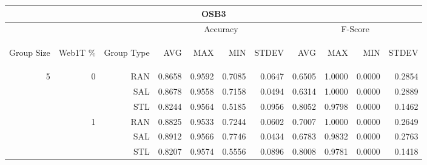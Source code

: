 \begin{center}
\begin{table}[htbp] 
 \begin{center}
\begin{tabular}{ | r | r | r | r | r | r | r | r | r | r | r |}
\hline
\multicolumn{11}{|c|}{OSB3}\\
\hline
 & & & \multicolumn{4}{|c|}{Accuracy} & \multicolumn{4}{|c|}{F-Score}\\ \cline{4-11}
\begin{sideways}Group Size\end{sideways} & \begin{sideways}Web1T \%\end{sideways} & \begin{sideways}Group Type\end{sideways} & \begin{sideways}AVG\end{sideways} & \begin{sideways}MAX\end{sideways} & \begin{sideways}MIN\end{sideways} & \begin{sideways}STDEV\end{sideways} & \begin{sideways}AVG\end{sideways} & \begin{sideways}MAX\end{sideways} & \begin{sideways}MIN\end{sideways} & \begin{sideways}STDEV\end{sideways}\\
\hline
\multirow{18}{*}{5}
 & \multirow{3}{*}{0} & RAN & 0.8658 & 0.9592 & 0.7085 & 0.0647 & 0.6505 & 1.0000 & 0.0000 & 0.2854\\ \cline{3-11}
 &   & SAL & 0.8678 & 0.9558 & 0.7158 & 0.0494 & 0.6314 & 1.0000 & 0.0000 & 0.2889\\ \cline{3-11}
 &   & STL & 0.8244 & 0.9564 & 0.5185 & 0.0956 & 0.8052 & 0.9798 & 0.0000 & 0.1462\\ \cline{2-11}
 & \multirow{3}{*}{1} & RAN & 0.8825 & 0.9533 & 0.7244 & 0.0602 & 0.7007 & 1.0000 & 0.0000 & 0.2649\\ \cline{3-11}
 &   & SAL & 0.8912 & 0.9566 & 0.7746 & 0.0434 & 0.6783 & 0.9832 & 0.0000 & 0.2763\\ \cline{3-11}
 &   & STL & 0.8207 & 0.9574 & 0.5556 & 0.0896 & 0.8008 & 0.9781 & 0.0000 & 0.1418\\ \cline{2-11}

\end{tabular}
\end{center}
\end{table}
\end{center}
